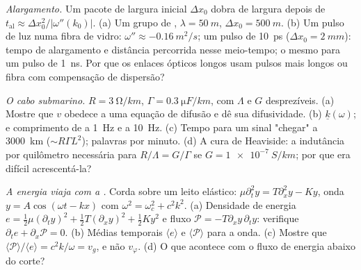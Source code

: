 \begin{exercise}[$\star\star$]\label{exo:b2:dispersion-wave-packets:8}
\emph{Alargamento.} Um pacote de largura inicial $\Delta x_0$ dobra de largura
depois de $t_{\text{al}} \approx \Delta x_0^2/|\omega''(k_0)|$. (a) Um grupo de , $\lambda = \qty{50}{m}$, $\Delta x_0 = \qty{500}{m}$. (b) Um pulso de luz numa
fibra de vidro: $\omega'' \approx \qty{-0.16}{m^2/s}$; um pulso de \qty{10}{ps} ($\Delta x_0 =
\qty{2}{mm}$): tempo de alargamento e distância percorrida nesse meio-tempo; o mesmo
para um pulso de \qty{1}{ns}. Por que os enlaces ópticos longos usam pulsos mais longos ou
fibra com compensação de dispersão?
\end{exercise}

\begin{exercise}[$\star\star$]\label{exo:b2:dispersion-wave-packets:9}
\emph{O cabo submarino.} $R = \qty{3}{\ohm/km}$, $\Gamma = \qty{0.3}{\micro F/km}$,
com $\Lambda$ e $G$ desprezíveis. (a) Mostre que $v$ obedece a uma equação de difusão e
dê sua difusividade. (b)  $\underline k(\omega)$;  e comprimento de  a \qty{1}{Hz} e a \qty{10}{Hz}. (c)
Tempo para um sinal "chegar" a \qty{3000}{km} ($\sim R\Gamma L^2$); palavras por
minuto. (d) A cura de Heaviside: a indutância por quilômetro necessária para
$R/\Lambda = G/\Gamma$ se $G = \qty{1e-7}{S/km}$; por que era difícil acrescentá-la?
\end{exercise}

\begin{exercise}[$\star\star\star$]\label{exo:b2:dispersion-wave-packets:10}
\emph{A energia viaja com a .} Corda sobre um leito elástico:
$\mu\partial_t^2y = T\partial_x^2y - Ky$, onda $y = A\cos(\omega t - kx)$ com $\omega^2 =
\omega_c^2 + c^2k^2$. (a) Densidade de energia $e = \tfrac12\mu(\partial_ty)^2 + \tfrac12T
(\partial_xy)^2 + \tfrac12Ky^2$ e fluxo $\mathcal P = -T\partial_xy\,\partial_ty$: verifique
$\partial_te + \partial_x\mathcal P = 0$. (b) Médias temporais $\langle e\rangle$ e
$\langle\mathcal P\rangle$ para a onda. (c) Mostre que $\langle\mathcal P\rangle/
\langle e\rangle = c^2k/\omega = v_g$, e não $v_\varphi$. (d) O que acontece com o
fluxo de energia abaixo do corte?
\end{exercise}

